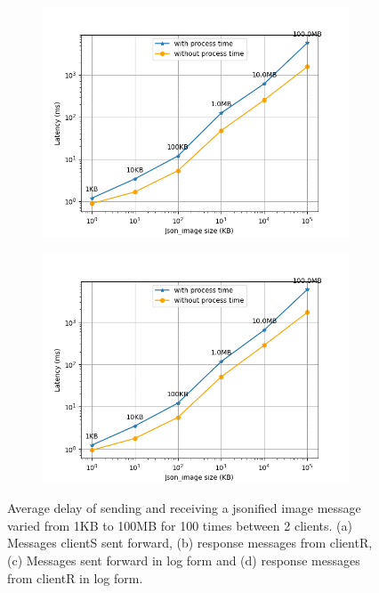\begin{figure}[htb]
\begin{subfigure}[b]{0.49\textwidth}
        \caption{} \label{fig: proportional-imagesize-b}
        \end{subfigure}
    \begin{subfigure}[b]{0.49\textwidth}
        \centering
        \includegraphics[width=\textwidth]{figures/tests/proportional_tests/log_Average_json_image_messages_sending_time_of_100_tests_1KB_to_100MB.png}\hfill 
        \caption{} \label{fig: proportional-imagesize-c}
    \end{subfigure}
    \begin{subfigure}[b]{0.49\textwidth}
        \centering
        \includegraphics[width=\textwidth]{figures/tests/proportional_tests/log_Average_json_image_messages_receiving_time_of_100_tests_1KB_to_100MB.png}\hfill 
        \caption{} \label{fig: proportional-imagesize-d}
    \end{subfigure}
    \caption{Average delay of sending and receiving a jsonified image message varied from 1KB 
    to 100MB for 100 times between 2 clients. (a) Messages clientS sent forward, 
    (b) response messages from clientR, (c) Messages sent forward in log form 
    and (d) response messages from clientR in log form. 
    \label{fig: proportional-imagesize}}
\end{figure}


